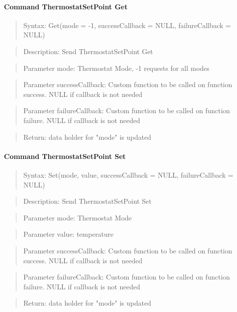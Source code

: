 \paragraph {Command ThermostatSetPoint Get}
\begin{quote} Syntax: Get(mode = -1, successCallback = NULL, failureCallback = NULL)\end{quote}
\begin{quote} Description: Send ThermostatSetPoint Get\end{quote}
\begin{quote} Parameter mode: Thermostat Mode, -1 requests for all modes\end{quote}
\begin{quote} Parameter successCallback: Custom function to be called on function success. NULL if callback is not needed\end{quote}
\begin{quote} Parameter failureCallback: Custom function to be called on function failure. NULL if callback is not needed\end{quote}
\begin{quote} Return: data holder for "mode"  is updated\end{quote}

\paragraph {Command ThermostatSetPoint Set}
\begin{quote} Syntax: Set(mode, value, successCallback = NULL, failureCallback = NULL)\end{quote}
\begin{quote} Description: Send ThermostatSetPoint Set\end{quote}
\begin{quote} Parameter mode: Thermostat Mode\end{quote}
\begin{quote} Parameter value: temperature\end{quote}
\begin{quote} Parameter successCallback: Custom function to be called on function success. NULL if callback is not needed\end{quote}
\begin{quote} Parameter failureCallback: Custom function to be called on function failure. NULL if callback is not needed\end{quote}
\begin{quote} Return: data holder for "mode"  is updated\end{quote}


